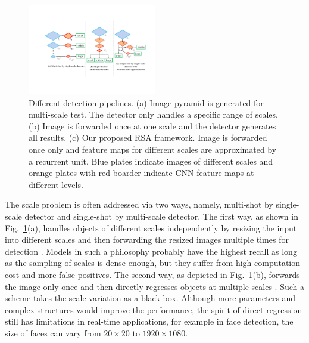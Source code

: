\documentclass[10pt,twocolumn,letterpaper]{article}
\begin{document}
\begin{figure}[t]
	\begin{center}
		\includegraphics[width=0.5\textwidth]{fig1.pdf}
	\end{center}
	\vspace{-.1cm}
\caption{Different detection pipelines. (a) Image pyramid is generated for multi-scale test. The detector only handles a specific range of scales. (b) Image is forwarded once at one scale and the detector generates all results. (c) Our proposed RSA framework. Image is forwarded once only and feature maps for different scales are approximated by a recurrent unit. Blue plates indicate images of different scales and orange plates with red boarder indicate CNN feature maps at different levels.	}
	\label{fig1}
	\vspace{-.3cm}
\end{figure}
The scale problem is often addressed via two ways, namely, multi-shot by single-scale detector and single-shot by multi-scale detector. The first way, as shown in Fig.~\ref{fig1}(a), handles objects of different scales independently by resizing the input into different scales and then forwarding the resized images multiple times 
for detection \cite{overfeat,li2015convolutional,chen2016supervised}. 
Models in such a philosophy  probably have the highest recall as long as the sampling of scales is dense enough, but they suffer from high computation cost and more false positives. 
%
The second way, as depicted in Fig.~\ref{fig1}(b), forwards the image only once and then directly regresses objects at multiple scales \cite{faster_rcnn,redmon2016you,liu2016ssd}.
Such a scheme takes the scale variation as a black box. Although more parameters and complex structures would improve the performance, the spirit of direct regression still has limitations in real-time applications, for example in face detection, the size of faces can vary from $20\times 20$ to $1920\times 1080$. 
\end{document}
